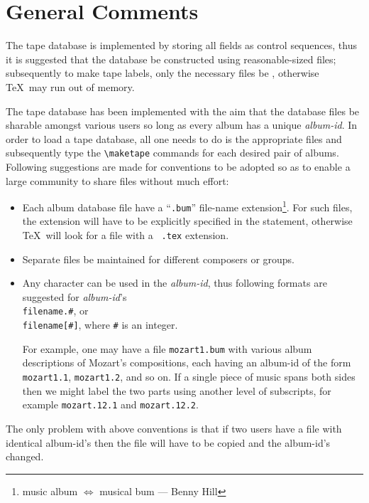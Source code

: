 \section*{General Comments}

The tape database is implemented by storing all fields as control sequences,
thus it is suggested that the database be constructed using reasonable-sized
files; subsequently to make tape labels, only the necessary files be
\verb||, otherwise \TeX\ may run out of memory.

The tape database has been implemented with the aim that the database
files be sharable amongst various users so long as every album has a unique
{\it album-id}. In order to load a tape database, all one needs to do is
\verb|| the appropriate files and subsequently type the
\verb|\maketape| commands for each desired pair of albums.
Following suggestions are made for conventions to be adopted
so as to enable a large community to share files without much effort:
\begin{itemize}
\item Each album database file have a ``{\tt .bum}'' file-name
extension\footnote{music album $\Leftrightarrow$ musical bum --- Benny Hill}.
For such files, the extension will have to be explicitly specified in the
\verb|| statement, otherwise \TeX\ will look for a file with a {\tt
.tex} extension.

\item Separate files be maintained for different composers or groups.

\item Any character can be used in the {\it album-id}, thus following
formats are suggested for {\it album-id}'s\\[1mm]
\hspace*{0.5in}\verb|filename.#|, or\\
\hspace*{0.5in}\verb|filename[#]|,  where {\tt \#} is an integer.

For example, one may have a file {\tt mozart1.bum} with various album
descriptions of Mozart's compositions, each having an album-id of the form 
{\tt mozart1.1}, {\tt mozart1.2}, and so on. If a single piece of music
spans both sides then we might label the two parts using another level of
subscripts, for example {\tt mozart.12.1} and {\tt mozart.12.2}.
\end{itemize}

The only problem with above conventions is that if two users have a file with
identical album-id's then the file will have to be
copied and the album-id's changed.


